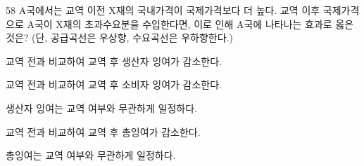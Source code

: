 \begin{question}{58}
A국에서는 교역 이전 X재의 국내가격이 국제가격보다 더 높다. 교역 이후 국제가격으로 A국이 X재의 초과수요분을 수입한다면, 이로 인해 A국에 나타나는 효과로 옳은 것은? (단, 공급곡선은 우상향, 수요곡선은 우하향한다.)
\begin{choices}
  \item 교역 전과 비교하여 교역 후 생산자 잉여가 감소한다.
  \item 교역 전과 비교하여 교역 후 소비자 잉여가 감소한다.
  \item 생산자 잉여는 교역 여부와 무관하게 일정하다.
  \item 교역 전과 비교하여 교역 후 총잉여가 감소한다.
  \item 총잉여는 교역 여부와 무관하게 일정하다.
\end{choices}
\end{question}
